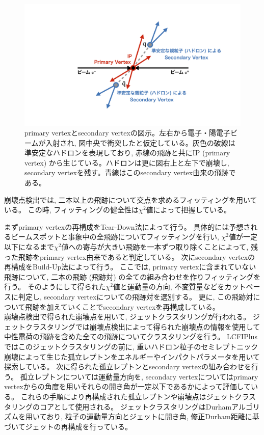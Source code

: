 \begin{figure}[htbp]
 \centering
 \includegraphics[trim = 0 100 0 50, width=1.0\textwidth, clip]{Figure/1Introduction/6ReconstructedVertex.png}
 \caption[primary vertexとsecondary vertexの図示]{primary vertexとsecondary vertexの図示。左右から電子・陽電子ビームが入射され, 図中央で衝突したと仮定している。灰色の破線は準安定なハドロンを表現しており, 赤線の飛跡と共にIP (primary vertex) から生じている。ハドロンは更に図右上と左下で崩壊し, secondary vertexを残す。青線はこのsecondary vertex由来の飛跡である。}
 \label{6ReconstructedVertex}
\end{figure}

崩壊点検出では, 二本以上の飛跡について交点を求めるフィッティングを用いている。
この時, フィッティングの健全性は$\chi^2$値によって把握している。

まずprimary vertexの再構成をTear-Down法によって行う。
具体的には予想されるビームスポットと事象中の全飛跡についてフィッティングを行い, $\chi^2$値が一定以下になるまで$\chi^2$値への寄与が大きい飛跡を一本ずつ取り除くことによって, 残った飛跡をprimary vertex由来であると判定している。
次にsecondary vertexの再構成をBuild-Up法によって行う。
ここでは, primary vertexに含まれていない飛跡について, 二本の飛跡 (飛跡対) の全ての組み合わせを作りフィッティングを行う。
そのようにして得られた$\chi^2$値と運動量の方向, 不変質量などをカットベースに判定し, secondary vertexについての飛跡対を選別する。
更に, この飛跡対について飛跡を加えていくことでsecondary vertexを再構成している。\\

崩壊点検出で得られた崩壊点を用いて, ジェットクラスタリングが行われる。
ジェットクラスタリングでは崩壊点検出によって得られた崩壊点の情報を使用して中性電荷の飛跡を含めた全ての飛跡についてクラスタリングを行う。
LCFIPlusではこのジェットクラスタリングの前に, 重いハドロン粒子のセミレプトニック崩壊によって生じた孤立レプトンをエネルギーやインパクトパラメータを用いて探索している。
次に得られた孤立レプトンとsecondary vertexの組み合わせを行う。
孤立レプトンについては運動量方向を, secondary vertexについてはprimary vertexからの角度を用いそれらの開き角が一定以下であるかによって評価している。
これらの手順により再構成された孤立レプトンや崩壊点はジェットクラスタリングのコアとして使用される。
ジェットクラスタリングはDurhamアルゴリズムを用いており, 粒子の運動量方向とジェットに開き角, 修正Durham距離に基づいてジェットの再構成を行っている。

